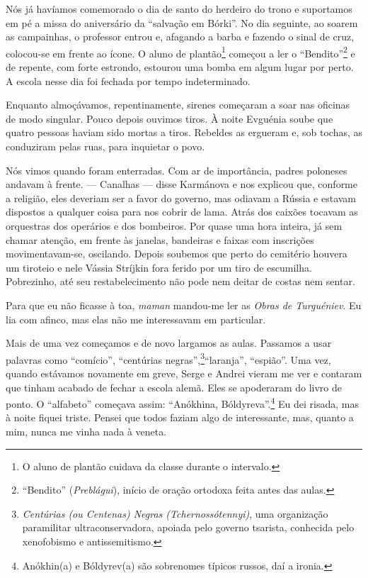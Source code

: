 Nós já havíamos comemorado o dia de santo do herdeiro do trono e
suportamos em pé a missa do aniversário da ``salvação em Bórki''. No dia
seguinte, ao soarem as campainhas, o professor entrou e, afagando a
barba e fazendo o sinal de cruz, colocou-se em frente ao ícone. O aluno
de plantão\footnote{O aluno de plantão cuidava da classe durante o
  intervalo.} começou a ler o ``Bendito''\footnote{``Bendito''
  (\emph{Preblágui}), início de oração ortodoxa feita antes das aulas.}
e de repente, com forte estrondo, estourou uma bomba em algum lugar por
perto. A escola nesse dia foi fechada por tempo indeterminado.

Enquanto almoçávamos, repentinamente, sirenes começaram a soar nas
oficinas de modo singular. Pouco depois ouvimos tiros. À noite Evguénia
soube que quatro pessoas haviam sido mortas a tiros. Rebeldes as
ergueram e, sob tochas, as conduziram pelas ruas, para inquietar o povo.

Nós vimos quando foram enterradas. Com ar de importância, padres
poloneses andavam à frente. --- Canalhas --- disse Karmánova e nos
explicou que, conforme a religião, eles deveriam ser a favor do governo,
mas odiavam a Rússia e estavam dispostos a qualquer coisa para nos
cobrir de lama. Atrás dos caixões tocavam as orquestras dos operários e
dos bombeiros. Por quase uma hora inteira, já sem chamar atenção, em
frente às janelas, bandeiras e faixas com inscrições movimentavam-se,
oscilando. Depois soubemos que perto do cemitério houvera um tiroteio e
nele Vássia Stríjkin fora ferido por um tiro de escumilha. Pobrezinho,
até seu restabelecimento não pode nem deitar de costas nem sentar.

Para que eu não ficasse à toa, \emph{maman} mandou-me ler as \emph{Obras
de Turguéniev}. Eu lia com afinco, mas elas não me interessavam em
particular.

Mais de uma vez começamos e de novo largamos as aulas. Passamos a usar
palavras como ``comício'', ``centúrias negras'',\footnote{\emph{Centúrias
  (ou Centenas) Negras (Tchernossótennyi)}, uma organização paramilitar
  ultraconservadora, apoiada pelo governo tsarista, conhecida pelo
  xenofobismo e antissemitismo.}``laranja'', ``espião''. Uma vez, quando
estávamos novamente em greve, Serge e Andrei vieram me ver e contaram
que tinham acabado de fechar a escola alemã. Eles se apoderaram do livro
de ponto. O ``alfabeto'' começava assim: ``Anókhina,
Bóldyreva''.\footnote{Anókhin(a) e Bóldyrev(a) são sobrenomes típicos
  russos, daí a ironia.} Eu dei risada, mas à noite fiquei triste.
Pensei que todos faziam algo de interessante, mas, quanto a mim, nunca
me vinha nada à veneta.

